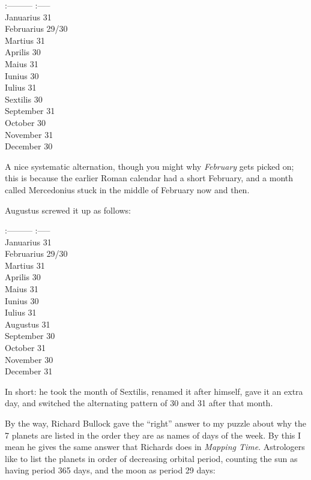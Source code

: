 \documentclass{article}
\begin{document}
:--------- \textbar{} :----- \textbar{}\\
Januarius \textbar{} 31 \textbar{}\\
Februarius \textbar{} 29/30 \textbar{}\\
Martius \textbar{} 31 \textbar{}\\
Aprilis \textbar{} 30 \textbar{}\\
Maius \textbar{} 31 \textbar{}\\
Iunius \textbar{} 30 \textbar{}\\
Iulius \textbar{} 31 \textbar{}\\
Sextilis \textbar{} 30 \textbar{}\\
September \textbar{} 31 \textbar{}\\
October \textbar{} 30 \textbar{}\\
November \textbar{} 31 \textbar{}\\
December \textbar{} 30 \textbar{}

A nice systematic alternation, though you might why \emph{February} gets
picked on; this is because the earlier Roman calendar had a short
February, and a month called Mercedonius stuck in the middle of February
now and then.

Augustus screwed it up as follows:

:--------- \textbar{} :----- \textbar{}\\
Januarius \textbar{} 31 \textbar{}\\
Februarius \textbar{} 29/30 \textbar{}\\
Martius \textbar{} 31 \textbar{}\\
Aprilis \textbar{} 30 \textbar{}\\
Maius \textbar{} 31 \textbar{}\\
Iunius \textbar{} 30 \textbar{}\\
Iulius \textbar{} 31 \textbar{}\\
Augustus \textbar{} 31 \textbar{}\\
September \textbar{} 30 \textbar{}\\
October \textbar{} 31 \textbar{}\\
November \textbar{} 30 \textbar{}\\
December \textbar{} 31 \textbar{}

In short: he took the month of Sextilis, renamed it after himself, gave
it an extra day, and switched the alternating pattern of 30 and 31 after
that month.

By the way, Richard Bullock gave the ``right'' answer to my puzzle about
why the 7 planets are listed in the order they are as names of days of
the week. By this I mean he gives the same answer that Richards does in
\emph{Mapping Time}. Astrologers like to list the planets in order of
decreasing orbital period, counting the sun as having period 365 days,
and the moon as period 29 days:
\end{document}
